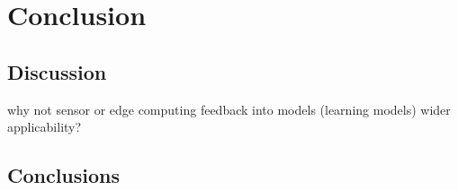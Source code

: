 \chapter{Conclusion}
\section{Discussion}
why not sensor or edge computing
feedback into models (learning models)
wider applicability?
\section{Conclusions}
